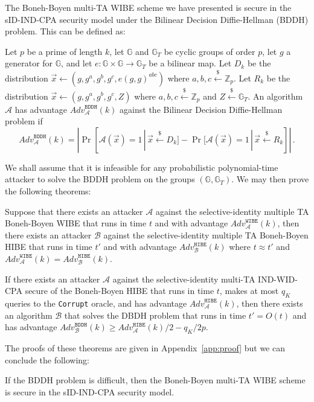 \documentclass[10pt]{llncs}
\newcommand{\A}{\mathcal{A}}
\newcommand{\B}{\mathcal{B}}
\newcommand{\Gbb}{\mathbb{G}}
\newcommand{\Zbb}{\mathbb{Z}}
\newcommand{\getsr}{\stackrel{{\scriptscriptstyle\$}}{\gets}}
\newcommand{\adv}[2]{\mathit{Adv}_{#1}^{\texttt{#2}}}
\begin{document}
The Boneh-Boyen multi-TA WIBE scheme we have presented is secure in
the sID-IND-CPA security model under the Bilinear Decision
Diffie-Hellman (BDDH) problem. This can be defined as:
\begin{definition}
Let $p$ be a prime of length $k$, let $\Gbb$ and $\Gbb_{T}$ be
cyclic groups of order $p$, let $g$ a generator for $\Gbb$, and let
$e:\Gbb \times \Gbb \rightarrow \Gbb_{T}$ be a bilinear map. Let
$D_{k}$ be the distribution $\vec{x} \gets
(g,g^{a},g^{b},g^{c},e(g,g)^{abc})$ where $a,b,c \getsr \Zbb_{p}$.
Let $R_{k}$ be the distribution $\vec{x} \gets
(g,g^{a},g^{b},g^{c},Z)$ where $a,b,c \getsr \Zbb_{p}$ and $Z\getsr
\Gbb_{T}$. An algorithm $\A$ has advantage $\adv{\A}{BDDH}(k)$ against the
Bilinear Decision Diffie-Hellman problem if
\begin{displaymath}
\adv{\A}{BDDH}(k) = |\Pr[\A(\vec{x})=1 \,|\, \vec{x} \getsr D_{k}] -
\Pr[\A(\vec{x})=1 \,|\, \vec{x} \getsr R_{k}]| \, .
\end{displaymath}
\end{definition}
We shall assume that it is infeasible for any probabilistic
polynomial-time attacker to solve the BDDH problem on the groups
$(\Gbb,\Gbb_{T})$. We may then prove the following theorems:

\begin{theorem}
Suppose that there exists an attacker $\A$ against the
selective-identity multiple TA Boneh-Boyen WIBE that runs in time
$t$ and with advantage $\adv{\A}{WIBE}(k)$, then there exists an
attacker $\B$ against the selective-identity multiple TA Boneh-Boyen
HIBE that runs in time $t'$ and with advantage $\adv{\B}{HIBE}(k)$
where $t \approx t'$ and $\adv{\A}{WIBE}(k) = \adv{\B}{HIBE}(k)$.
\end{theorem}

\begin{theorem}
If there exists an attacker $\A$ against the selective-identity
multi-TA IND-WID-CPA secure of the Boneh-Boyen HIBE that runs in
time $t$, makes at most $q_{K}$ queries to the \texttt{Corrupt}
oracle, and has advantage $\adv{\A}{HIBE}(k)$, then there exists an
algorithm $\B$ that solves the DBDH problem that runs in time
$t'=O(t)$ and has advantage $\adv{\B}{BDDH}(k)
\geq \adv{\A}{HIBE}(k)/2 -q_{K}/2p$.
\end{theorem}

The proofs of these theorems are given in Appendix~\ref{app:proof}
but we can conclude the following:

\begin{corollary}
If the BDDH problem is difficult, then the Boneh-Boyen multi-TA WIBE
scheme is secure in the sID-IND-CPA security model.
\end{corollary}
\end{document}
